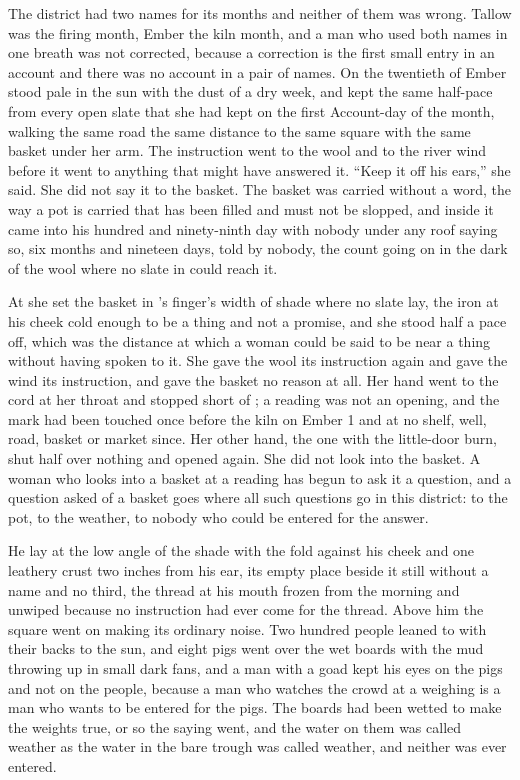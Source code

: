 
The district had two names for its months and neither of them was wrong. Tallow was the firing month, Ember the kiln month, and a man who used both names in one breath was not corrected, because a correction is the first small entry in an account and there was no account in a pair of names. On the twentieth of Ember  stood pale in the sun with the dust of a dry week, and  kept the same half-pace from every open slate that she had kept on the first Account-day of the month, walking the same road the same distance to the same square with the same basket under her arm. The instruction went to the wool and to the river wind before it went to anything that might have answered it. “Keep it off his ears,” she said. She did not say it to the basket. The basket was carried without a word, the way a pot is carried that has been filled and must not be slopped, and  inside it came into his hundred and ninety-ninth day with nobody under any roof saying so, six months and nineteen days, told by nobody, the count going on in the dark of the wool where no slate in  could reach it.

At  she set the basket in 's finger's width of shade where no slate lay, the iron at his cheek cold enough to be a thing and not a promise, and she stood half a pace off, which was the distance at which a woman could be said to be near a thing without having spoken to it. She gave the wool its instruction again and gave the wind its instruction, and gave the basket no reason at all. Her hand went to the cord at her throat and stopped short of ; a reading was not an opening, and the mark had been touched once before the kiln on Ember 1 and at no shelf, well, road, basket or market since. Her other hand, the one with the little-door burn, shut half over nothing and opened again. She did not look into the basket. A woman who looks into a basket at a reading has begun to ask it a question, and a question asked of a basket goes where all such questions go in this district: to the pot, to the weather, to nobody who could be entered for the answer.

He lay at the low angle of the shade with the fold against his cheek and one leathery crust two inches from his ear, its empty place beside it still without a name and no third, the thread at his mouth frozen from the morning and unwiped because no instruction had ever come for the thread. Above him the square went on making its ordinary noise. Two hundred people leaned to  with their backs to the sun, and eight pigs went over the wet boards with the mud throwing up in small dark fans, and a man with a goad kept his eyes on the pigs and not on the people, because a man who watches the crowd at a weighing is a man who wants to be entered for the pigs. The boards had been wetted to make the weights true, or so the saying went, and the water on them was called weather as the water in the bare trough was called weather, and neither was ever entered.

